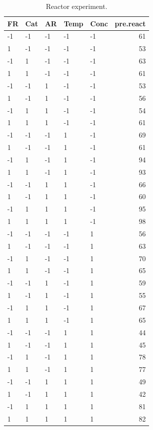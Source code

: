 \documentclass[
]{book}
\theoremstyle{definition}
\theoremstyle{definition}
\theoremstyle{definition}
\theoremstyle{definition}
\theoremstyle{remark}
\begin{document}
\begin{enumerate}
\begin{table}
   \caption{\label{tab:reactor-data}Reactor experiment.}
   \centering
   \begin{tabular}[t]{l|l|l|l|l|r}
   \hline
   FR & Cat & AR & Temp & Conc & pre.react\\
   \hline
   -1 & -1 & -1 & -1 & -1 & 61\\
   \hline
   1 & -1 & -1 & -1 & -1 & 53\\
   \hline
   -1 & 1 & -1 & -1 & -1 & 63\\
   \hline
   1 & 1 & -1 & -1 & -1 & 61\\
   \hline
   -1 & -1 & 1 & -1 & -1 & 53\\
   \hline
   1 & -1 & 1 & -1 & -1 & 56\\
   \hline
   -1 & 1 & 1 & -1 & -1 & 54\\
   \hline
   1 & 1 & 1 & -1 & -1 & 61\\
   \hline
   -1 & -1 & -1 & 1 & -1 & 69\\
   \hline
   1 & -1 & -1 & 1 & -1 & 61\\
   \hline
   -1 & 1 & -1 & 1 & -1 & 94\\
   \hline
   1 & 1 & -1 & 1 & -1 & 93\\
   \hline
   -1 & -1 & 1 & 1 & -1 & 66\\
   \hline
   1 & -1 & 1 & 1 & -1 & 60\\
   \hline
   -1 & 1 & 1 & 1 & -1 & 95\\
   \hline
   1 & 1 & 1 & 1 & -1 & 98\\
   \hline
   -1 & -1 & -1 & -1 & 1 & 56\\
   \hline
   1 & -1 & -1 & -1 & 1 & 63\\
   \hline
   -1 & 1 & -1 & -1 & 1 & 70\\
   \hline
   1 & 1 & -1 & -1 & 1 & 65\\
   \hline
   -1 & -1 & 1 & -1 & 1 & 59\\
   \hline
   1 & -1 & 1 & -1 & 1 & 55\\
   \hline
   -1 & 1 & 1 & -1 & 1 & 67\\
   \hline
   1 & 1 & 1 & -1 & 1 & 65\\
   \hline
   -1 & -1 & -1 & 1 & 1 & 44\\
   \hline
   1 & -1 & -1 & 1 & 1 & 45\\
   \hline
   -1 & 1 & -1 & 1 & 1 & 78\\
   \hline
   1 & 1 & -1 & 1 & 1 & 77\\
   \hline
   -1 & -1 & 1 & 1 & 1 & 49\\
   \hline
   1 & -1 & 1 & 1 & 1 & 42\\
   \hline
   -1 & 1 & 1 & 1 & 1 & 81\\
   \hline
   1 & 1 & 1 & 1 & 1 & 82\\
   \hline
   \end{tabular}
   \end{table}


\end{enumerate}
\end{document}
